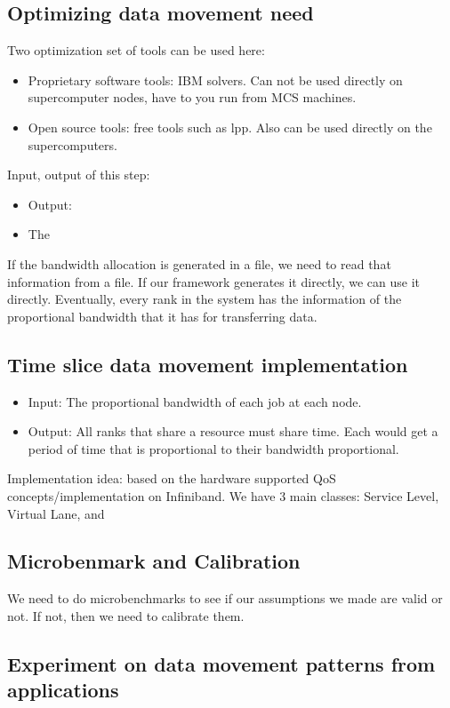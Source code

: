 \documentclass[letter]{article}
\begin{document}
\subsection {Optimizing data movement need}
Two optimization set of tools can be used here:
\begin{itemize}
\item Proprietary software tools: IBM solvers. Can not be used directly on supercomputer nodes, have to you run from MCS machines.
\item Open source tools: free tools such as lpp. Also can be used directly on the supercomputers.
\end{itemize}

Input, output of this step:
\begin{itemize}
\item Output:
\item The
\end{itemize}

If the bandwidth allocation is generated in a file, we need to read that information from a file. If our framework generates it directly, we can use it directly. Eventually, every rank in the system has the information of the proportional bandwidth that it has for transferring data.

\subsection{Time slice data movement implementation}
\begin{itemize}
\item Input: The proportional bandwidth of each job at each node.
\item Output: All ranks that share a resource must share time. Each would get a period of time that is proportional to their bandwidth proportional.
\end{itemize}

Implementation idea: based on the hardware supported QoS concepts/implementation on Infiniband. We have 3 main classes: Service Level, Virtual Lane, and 

\subsection{Microbenmark and Calibration}

We need to do microbenchmarks to see if our assumptions we made are valid or not. If not, then we need to calibrate them.

\subsection{Experiment on data movement patterns from applications}
\end{document}
